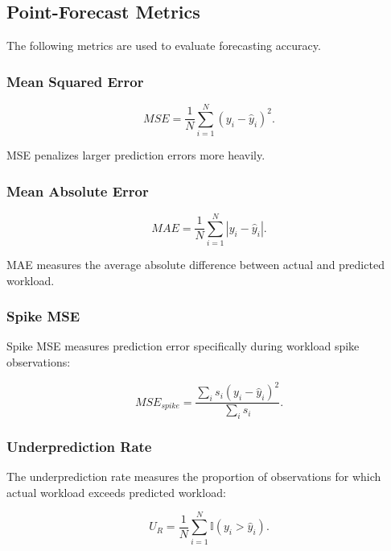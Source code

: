 \documentclass[conference]{IEEEtran}
\begin{document}
\subsection{Point-Forecast Metrics}

The following metrics are used to evaluate forecasting accuracy.

\subsubsection{Mean Squared Error}

\begin{equation}
MSE=\frac{1}{N}\sum_{i=1}^{N}(y_i-\hat{y}_i)^2.
\end{equation}

MSE penalizes larger prediction errors more heavily.

\subsubsection{Mean Absolute Error}

\begin{equation}
MAE=\frac{1}{N}\sum_{i=1}^{N}|y_i-\hat{y}_i|.
\end{equation}

MAE measures the average absolute difference between actual and predicted workload.

\subsubsection{Spike MSE}

Spike MSE measures prediction error specifically during workload spike observations:

\begin{equation}
MSE_{spike}=
\frac{\sum_i s_i(y_i-\hat{y}_i)^2}
{\sum_i s_i}.
\end{equation}

\subsubsection{Underprediction Rate}

The underprediction rate measures the proportion of observations for which actual workload exceeds predicted workload:

\begin{equation}
U_R=
\frac{1}{N}
\sum_{i=1}^{N}
\mathbb{I}(y_i>\hat{y}_i).
\end{equation}
\end{document}
